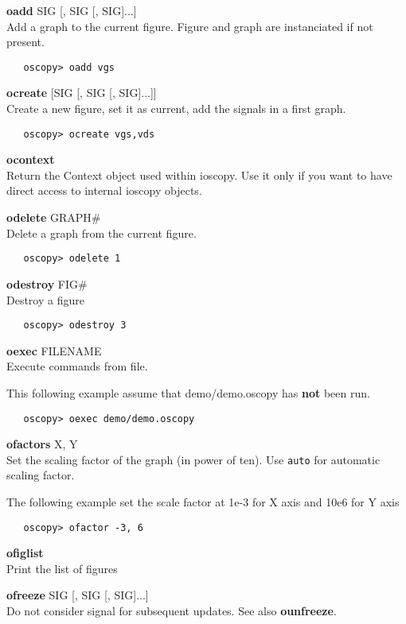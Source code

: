 \documentclass[a4paper,11pt]{article}
\begin{document}
\newcommand{\ocmd}[2]{\vspace{5mm}\noindent\textbf{#1} #2\\}

\ocmd{oadd}{SIG [, SIG [, SIG]...]}
   Add a graph to the current figure. Figure and graph are instanciated if not present.

\begin{verbatim}
   oscopy> oadd vgs
\end{verbatim}

\ocmd{ocreate}{[SIG [, SIG [, SIG]...]]}
   Create a new figure, set it as current, add the signals in a first graph.

\begin{verbatim}
   oscopy> ocreate vgs,vds
\end{verbatim}

\ocmd{ocontext}{\ }
   Return the Context object used within ioscopy. Use it only if you want to have direct access to internal ioscopy objects.

\ocmd{odelete}{GRAPH\#}
   Delete a graph from the current figure.

\begin{verbatim}
   oscopy> odelete 1
\end{verbatim}

\ocmd{odestroy}{FIG\#}
   Destroy a figure

\begin{verbatim}
   oscopy> odestroy 3
\end{verbatim}

\ocmd{oexec}{FILENAME}
   Execute commands from file.

   This following example assume that demo/demo.oscopy has \textbf{not} been run.

\begin{verbatim}
   oscopy> oexec demo/demo.oscopy
\end{verbatim}

\ocmd{ofactors}{X, Y}
   Set the scaling factor of the graph (in power of ten). Use \texttt{auto} for automatic scaling factor.

\noindent   The following example set the scale factor at 1e-3 for X axis and 10e6 for Y axis
\begin{verbatim}
   oscopy> ofactor -3, 6
\end{verbatim}

\ocmd{ofiglist}{\ }
   Print the list of figures

\ocmd{ofreeze}{SIG [, SIG [, SIG]...]}
   Do not consider signal for subsequent updates. See also \textbf{ounfreeze}.
\end{document}
